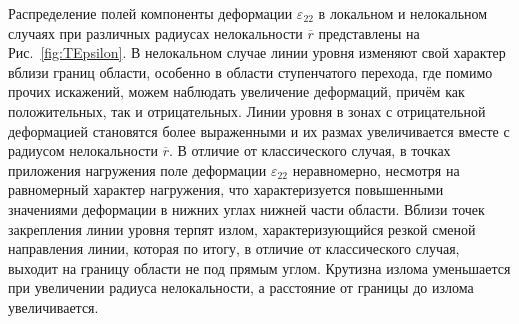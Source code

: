 Распределение полей компоненты деформации $\varepsilon_{22}$ в локальном и нелокальном случаях при различных радиусах нелокальности $\overline{r}$ представлены на Рис.~\ref{fig:TEpsilon}. В нелокальном случае линии уровня изменяют свой характер вблизи границ области, особенно в области ступенчатого перехода, где помимо прочих искажений, можем наблюдать увеличение деформаций, причём как положительных, так и отрицательных. Линии уровня в зонах с отрицательной деформацией становятся более выраженными и их размах увеличивается вместе с радиусом нелокальности $\overline{r}$. В отличие от классического случая, в точках приложения нагружения поле деформации $\varepsilon_{22}$ неравномерно, несмотря на равномерный характер нагружения, что характеризуется повышенными значениями деформации в нижних углах нижней части области. Вблизи точек закрепления линии уровня терпят излом, характеризующийся резкой сменой направления линии, которая по итогу, в отличие от классического случая, выходит на границу области не под прямым углом. Крутизна излома уменьшается при увеличении радиуса нелокальности, а расстояние от границы до излома увеличивается.

